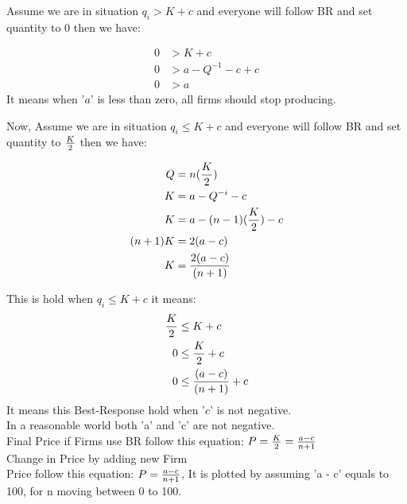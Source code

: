 \documentclass[
  course = {{IE579 Game Theory and Multi-Agent Reinforcement Learning}},
  assignment = 1,
  name = {{Mohammad Mahdi Rahimi}},
  studentnumber = {{20208244}},
  email = {{mahi@kaist.ac.kr}},
  firstexercise = 1
]{aga-homework}
\begin{document}
Assume we are in situation $q_i > K + c$ and everyone will follow BR and set quantity to 0 then we have:

\begin{equation} \label{eq1}
\begin{split}
0 & > K + c \\
0 & > a - Q^{-1} - c + c\\
0 & > a
\end{split}
\end{equation}
It means when '$a$' is less than zero, all firms should stop producing.

Now, Assume we are in situation $q_i \le K + c$ and everyone will follow BR and set quantity to $K \over 2$ then we have:

\begin{equation} \label{eq1}
\begin{split}
Q & = n({K \over 2}) \\
K & = a - Q^{-i} - c\\
K & = a - (n - 1)({K \over 2}) - c\\
(n+1)K & = 2(a - c)\\
K & = {2(a - c) \over (n + 1)}\\
\end{split}
\end{equation}

This is hold when $q_i \le K + c$ it means:
\begin{equation} \label{eq1}
\begin{split}
{K \over 2} & \le K + c\\
0 & \le {K \over 2} + c\\
0 & \le {(a - c) \over (n + 1)} + c
\end{split}
\end{equation}
It means this Best-Response hold when '$c$' is not negative.\\
In a reasonable world both 'a' and 'c' are not negative.\\
Final Price if Firms use BR follow this equation: $P = {K \over 2} = {a - c \over n + 1}$\\

\subexercise Change in Price by adding new Firm\\

Price follow this equation: $P = {a - c \over n + 1}$, It is plotted by assuming 'a - c' equals to 100, for n moving between 0 to 100.

\begin{center}
\end{center}
\end{document}
